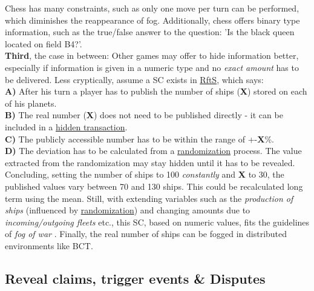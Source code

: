 Chess has many constraints, such as only one move per turn can be performed, which diminishes the reappearance of fog.
Additionally, chess offers binary type information, such as the true/false answer to the question:
'Is the black queen located on field B4?'.\\
\textbf{Third}, the case in between:
Other games may offer to hide information better, especially if information is given in a numeric type and no \textit{exact amount} has to be delivered.
Less cryptically, assume a \gls{SC} exists in \hyperref[def:RftS]{RftS}, which says: \\
\textbf{A)} After his turn a player has to publish the number of ships (\textbf{X}) stored on each of his planets. \\
\textbf{B)} The real number (\textbf{X}) does not need to be published directly - it can be included in a \hyperref[HiddenTransactions]{hidden transaction}. \\
\textbf{C)} The publicly accessible number has to be within the range of +-\textbf{X}\%. \\
\textbf{D)} The deviation has to be calculated from a \hyperref[lbl:Randomization]{randomization} process.
The value extracted from the randomization may stay hidden until it has to be revealed.\\
Concluding, setting the number of ships to 100 \textit{constantly} and \textbf{X} to 30, the published values vary between 70 and 130 ships.
This could be recalculated long term using the mean.
Still, with extending variables such as the \textit{production of ships} (influenced by \hyperref[lbl:Randomization]{randomization}) and changing amounts due to \textit{incoming/outgoing fleets} etc., this \gls{SC}, based on numeric values, fits the guidelines of \textit{fog of war} \cite[3-4]{Setear.1989}.
Finally, the real number of ships can be fogged in distributed environments like \gls{BCT}.



\subsection{Reveal claims, trigger events \& Disputes}
\label{sec:RcTeDisputes}

